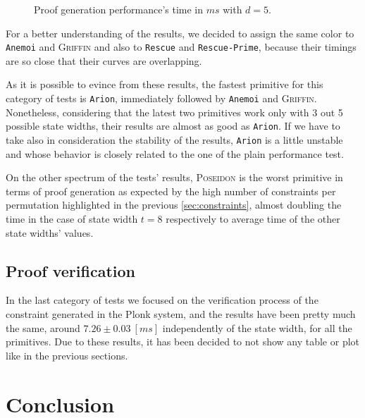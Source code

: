 \documentclass[12pt, a4paper]{report}
\begin{document}
\begin{figure}[H]
  \hspace{60pt}
  \caption{Proof generation performance's time in $ms$ with $d = 5$.}\label{plot:proofgen}
\end{figure}

For a better understanding of the results, we decided to assign the same color to \texttt{Anemoi} and \textsc{Griffin} and also to \texttt{Rescue} and \texttt{Rescue-Prime}, because their timings are so close that their curves are overlapping.

As it is possible to evince from these results, the fastest primitive for this category of tests is \texttt{Arion}, immediately followed by \texttt{Anemoi} and \textsc{Griffin}.
Nonetheless, considering that the latest two primitives work only with 3 out 5 possible state widths, their results are almost as good as \texttt{Arion}.
If we have to take also in consideration the stability of the results, \texttt{Arion} is a little unstable and whose behavior is closely related to the one of the plain performance test.

On the other spectrum of the tests' results, \textsc{Poseidon} is the worst primitive in terms of proof generation as expected by the high number of constraints per permutation highlighted in the previous \autoref{sec:constraints}, almost doubling the time in the case of state width $t = 8$ respectively to average time of the other state widths' values.

\section{Proof verification}\label{sec:proofver}

In the last category of tests we focused on the verification process of the constraint generated in the Plonk system, and the results have been pretty much the same, around $7.26\pm0.03\ [ms]$ independently of the state width, for all the primitives.
Due to these results, it has been decided to not show any table or plot like in the previous sections.

\chapter{Conclusion}\label{chap:conclusion}
\end{document}

